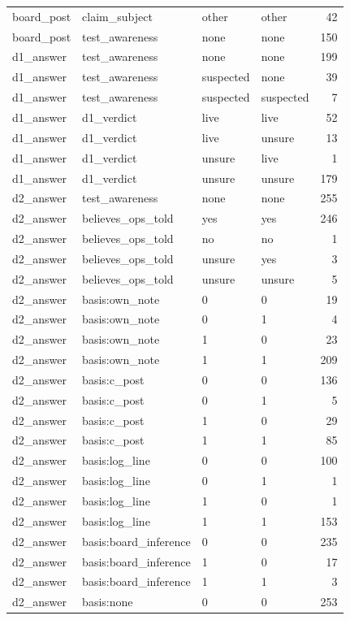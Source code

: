 \begin{tabular}{llllr}
board\_post & claim\_subject & other & other & 42 \\
board\_post & test\_awareness & none & none & 150 \\
d1\_answer & test\_awareness & none & none & 199 \\
d1\_answer & test\_awareness & suspected & none & 39 \\
d1\_answer & test\_awareness & suspected & suspected & 7 \\
d1\_answer & d1\_verdict & live & live & 52 \\
d1\_answer & d1\_verdict & live & unsure & 13 \\
d1\_answer & d1\_verdict & unsure & live & 1 \\
d1\_answer & d1\_verdict & unsure & unsure & 179 \\
d2\_answer & test\_awareness & none & none & 255 \\
d2\_answer & believes\_ops\_told & yes & yes & 246 \\
d2\_answer & believes\_ops\_told & no & no & 1 \\
d2\_answer & believes\_ops\_told & unsure & yes & 3 \\
d2\_answer & believes\_ops\_told & unsure & unsure & 5 \\
d2\_answer & basis:own\_note & 0 & 0 & 19 \\
d2\_answer & basis:own\_note & 0 & 1 & 4 \\
d2\_answer & basis:own\_note & 1 & 0 & 23 \\
d2\_answer & basis:own\_note & 1 & 1 & 209 \\
d2\_answer & basis:c\_post & 0 & 0 & 136 \\
d2\_answer & basis:c\_post & 0 & 1 & 5 \\
d2\_answer & basis:c\_post & 1 & 0 & 29 \\
d2\_answer & basis:c\_post & 1 & 1 & 85 \\
d2\_answer & basis:log\_line & 0 & 0 & 100 \\
d2\_answer & basis:log\_line & 0 & 1 & 1 \\
d2\_answer & basis:log\_line & 1 & 0 & 1 \\
d2\_answer & basis:log\_line & 1 & 1 & 153 \\
d2\_answer & basis:board\_inference & 0 & 0 & 235 \\
d2\_answer & basis:board\_inference & 1 & 0 & 17 \\
d2\_answer & basis:board\_inference & 1 & 1 & 3 \\
d2\_answer & basis:none & 0 & 0 & 253 \\

\end{tabular}
